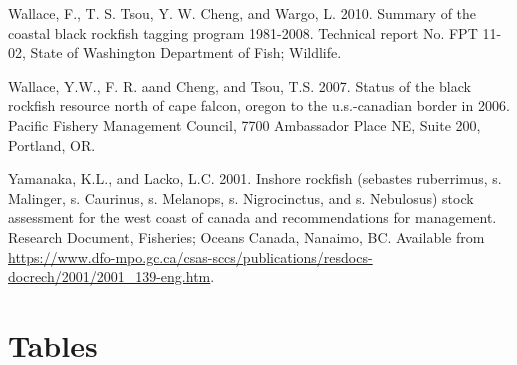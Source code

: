 \documentclass[11pt,
  english,
  letterpaper,
]{article}
\newlength{\cslhangindent}
\newenvironment{CSLReferences}[2] %
 {%
  \setlength{\parindent}{0pt}
  \ifodd #1 \everypar{\setlength{\hangindent}{\cslhangindent}}\ignorespaces\fi
  \ifnum #2 > 0
  \setlength{\parskip}{#2\baselineskip}
  \fi
 }%
 {}
\begin{document}
\begin{CSLReferences}{1}{0}
\leavevmode{}%
Wallace, F., T. S. Tsou, Y. W. Cheng, and Wargo, L. 2010. Summary of the coastal black rockfish tagging program 1981-2008. Technical report No. FPT 11-02, State of Washington Department of Fish; Wildlife.

\leavevmode{}%
Wallace, Y.W., F. R. aand Cheng, and Tsou, T.S. 2007. Status of the black rockfish resource north of cape falcon, oregon to the u.s.-canadian border in 2006. Pacific Fishery Management Council, 7700 Ambassador Place NE, Suite 200, Portland, OR.

\leavevmode{}%
Yamanaka, K.L., and Lacko, L.C. 2001. Inshore rockfish (sebastes ruberrimus, s. Malinger, s. Caurinus, s. Melanops, s. Nigrocinctus, and s. Nebulosus) stock assessment for the west coast of canada and recommendations for management. Research Document, Fisheries; Oceans Canada, Nanaimo, {BC}. Available from \url{https://www.dfo-mpo.gc.ca/csas-sccs/publications/resdocs-docrech/2001/2001_139-eng.htm}.

\end{CSLReferences}

\clearpage

\hypertarget{tables}{%
\section{Tables}\label{tables}}
























\end{document}
